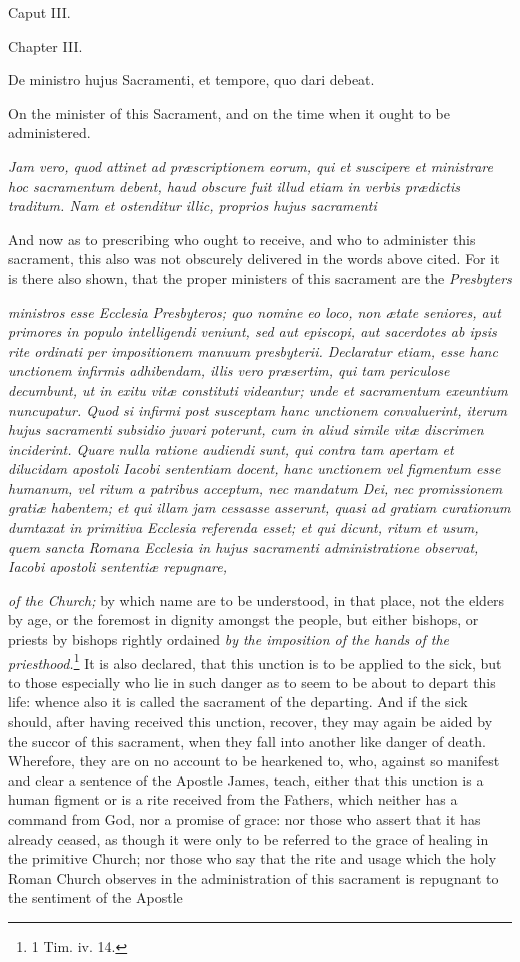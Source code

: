 Caput III.

Chapter III.

De ministro hujus Sacramenti, et tempore, quo dari debeat.

On the minister of this Sacrament, and on the time when it ought to be administered.

\emph{Jam vero, quod attinet ad præscriptionem eorum, qui et suscipere et ministrare hoc sacramentum debent, haud obscure fuit illud etiam in verbis prædictis traditum. Nam et ostenditur illic, proprios hujus sacramenti }

And now as to prescribing who ought to receive, and who to administer this sacrament, this also was not obscurely delivered in the words above cited. For it is there also shown, that the proper ministers of this sacrament are the \emph{Presbyters}

\emph{ministros esse Ecclesia Presbyteros; quo nomine eo loco, non ætate seniores, aut primores in populo intelligendi veniunt, sed aut episcopi, aut sacerdotes ab ipsis rite ordinati per impositionem manuum presbyterii. Declaratur etiam, esse hanc unctionem infirmis adhibendam, illis vero præsertim, qui tam periculose decumbunt, ut in exitu vitæ constituti videantur; unde et sacramentum exeuntium nuncupatur. Quod si infirmi post susceptam hanc unctionem convaluerint, iterum hujus sacramenti subsidio juvari poterunt, cum in aliud simile vitæ discrimen inciderint. Quare nulla ratione audiendi sunt, qui contra tam apertam et dilucidam apostoli Iacobi sententiam docent, hanc unctionem vel figmentum esse humanum, vel ritum a patribus acceptum, nec mandatum Dei, nec promissionem gratiæ habentem; et qui illam jam cessasse asserunt, quasi ad gratiam curationum dumtaxat in primitiva Ecclesia referenda esset; et qui dicunt, ritum et usum, quem sancta Romana Ecclesia in hujus sacramenti administratione observat, Iacobi apostoli sententiæ repugnare, }

\emph{of the Church;} by which name are to be understood, in that place, not the elders by age, or the foremost in dignity amongst the people, but either bishops, or priests by bishops rightly ordained \emph{by the imposition of the hands of the priesthood.}\footnote{\par   1 Tim. iv. 14.} It is also declared, that this unction is to be applied to the sick, but to those especially who lie in such danger as to seem to be about to depart this life: whence also it is called the sacrament of the departing. And if the sick should, after having received this unction, recover, they may again be aided by the succor of this sacrament, when they fall into another like danger of death. Wherefore, they are on no account to be hearkened to, who, against so manifest and clear a sentence of the Apostle James, teach, either that this unction is a human figment or is a rite received from the Fathers, which neither has a command from God, nor a promise of grace: nor those who assert that it has already ceased, as though it were only to be referred to the grace of healing in the primitive Church; nor those who say that the rite and usage which the holy Roman Church observes in the administration of this sacrament is repugnant to the sentiment of the Apostle

